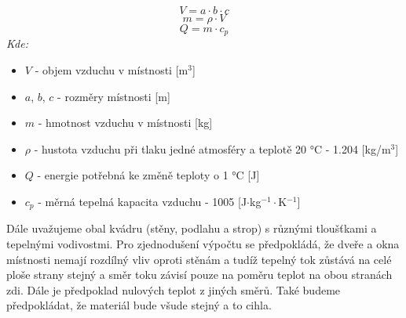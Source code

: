 \begin{equation}
    V = a \cdot b \cdot c
    \label{eq:objem}
\end{equation}
\begin{equation}
    m = \rho \cdot V
    \label{eq:hmotnost}
\end{equation}
\begin{equation}
    Q = m \cdot c_p
    \label{eq:energie}
\end{equation}
\noindent\textit{Kde:}
\begin{itemize}
    \item $V$ - objem vzduchu v místnosti [m$^3$]
    \item $a$, $b$, $c$ - rozměry místnosti [m]
    \item $m$ - hmotnost vzduchu v místnosti [kg]
    \item $\rho$ - hustota vzduchu při tlaku jedné atmosféry a teplotě 20 °C - 1.204 [kg/m$^3$]
    \item $Q$ - energie potřebná ke změně teploty o 1 °C [J]
    \item $c_p$ - měrná tepelná kapacita vzduchu - 1005 [J$\cdot$kg$^{-1}\cdot$K$^{-1}$] \newline
\end{itemize}
\noindent Dále uvažujeme obal kvádru (stěny, podlahu a strop) s různými tloušťkami a tepelnými vodivostmi. Pro zjednodušení výpočtu se předpokládá, že dveře a okna místnosti nemají rozdílný vliv oproti stěnám a tudíž tepelný tok zůstává na celé ploše strany stejný a směr toku závisí pouze na poměru teplot na obou stranách zdi. Dále je předpoklad nulových teplot z jiných směrů. Také budeme předpokládat, že materiál bude všude stejný a to cihla. 

